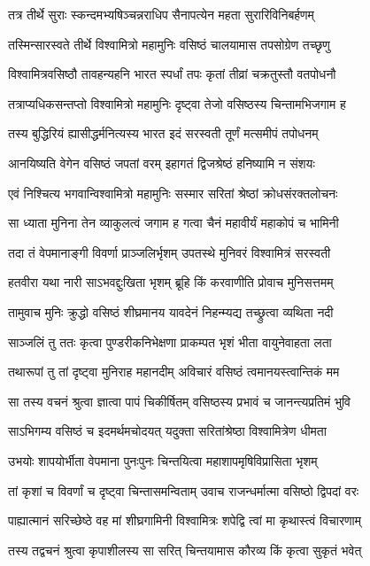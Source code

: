 \twolineshloka
{तत्र तीर्थे सुराः स्कन्दमभ्यषिञ्चन्नराधिप}
{सैनापत्येन महता सुरारिविनिबर्हणम्}


\twolineshloka
{तस्मिन्सारस्वते तीर्थे विश्वामित्रो महामुनिः}
{वसिष्ठं चालयामास तपसोग्रेण तच्छृणु}


\twolineshloka
{विश्वामित्रवसिष्ठौ तावहन्यहनि भारत}
{स्पर्धां तपः कृतां तीव्रां चक्रतुस्तौ वतपोधनौ}


\twolineshloka
{तत्राप्यधिकसन्तप्तो विश्वामित्रो महामुनिः}
{दृष्ट्वा तेजो वसिष्ठस्य चिन्तामभिजगाम ह}


\twolineshloka
{तस्य बुद्धिरियं ह्यासीद्धर्मनित्यस्य भारत}
{इदं सरस्वती तूर्णं मत्समीपं तपोधनम्}


\twolineshloka
{आनयिष्यति वेगेन वसिष्ठं जपतां वरम्}
{इहागतं द्विजश्रेष्ठं हनिष्यामि न संशयः}


\twolineshloka
{एवं निश्चित्य भगवान्विश्वामित्रो महामुनिः}
{सस्मार सरितां श्रेष्ठां क्रोधसंरक्तलोचनः}


\twolineshloka
{सा ध्याता मुनिना तेन व्याकुलत्वं जगाम ह}
{गत्वा चैनं महावीर्यं महाकोपं च भामिनी}


\twolineshloka
{तदा तं वेपमानाङ्गी विवर्णा प्राञ्जलिर्भृशम्}
{उपतस्थे मुनिवरं विश्वामित्रं सरस्वती}


\twolineshloka
{हतवीरा यथा नारी साऽभवद्दुःखिता भृशम्}
{ब्रूहि किं करवाणीति प्रोवाच मुनिसत्तमम्}


\twolineshloka
{तामुवाच मुनिः क्रुद्धो वसिष्ठं शीघ्रमानय}
{यावदेनं निहन्म्यद्य तच्छ्रुत्वा व्यथिता नदी}


\twolineshloka
{साञ्जलिं तु ततः कृत्वा पुण्डरीकनिभेक्षणा}
{प्राकम्पत भृशं भीता वायुनेवाहता लता}


\twolineshloka
{तथारूपां तु तां दृष्ट्वा मुनिराह महानदीम्}
{अविचारं वसिष्ठं त्वमानयस्त्वान्तिकं मम}


\twolineshloka
{सा तस्य वचनं श्रुत्वा ज्ञात्वा पापं चिकीर्षितम्}
{वसिष्ठस्य प्रभावं च जानन्त्यप्रतिमं भुवि}


\twolineshloka
{साऽभिगम्य वसिष्ठं च इदमर्थमचोदयत्}
{यदुक्ता सरितांश्रेष्ठा विश्वामित्रेण धीमता}


\twolineshloka
{उभयोः शापयोर्भीता वेपमाना पुनःपुनः}
{चिन्तयित्वा महाशापमृषिविप्रासिता भृशम्}


\twolineshloka
{तां कृशां च विवर्णां च दृष्ट्वा चिन्तासमन्विताम्}
{उवाच राजन्धर्मात्मा वसिष्ठो द्विपदां वरः}


\twolineshloka
{पाह्यात्मानं सरिच्छेष्ठे वह मां शीघ्रगामिनी}
{विश्वामित्रः शपेद्वि त्वां मा कृथास्त्वं विचारणाम्}


\twolineshloka
{तस्य तद्वचनं श्रुत्वा कृपाशीलस्य सा सरित्}
{चिन्तयामास कौरव्य किं कृत्वा सुकृतं भवेत्}


